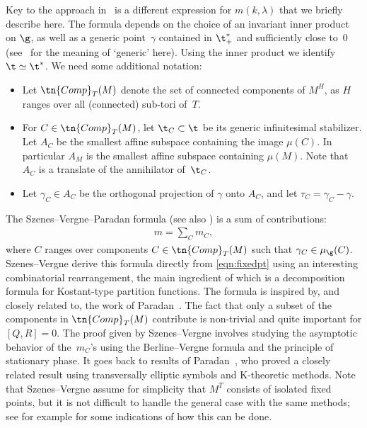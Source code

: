 Key to the approach in~\cite{SzenesVergne2010} is a different expression for $m(k,\lambda)$ that we briefly describe here. The formula depends on the choice of an invariant inner product on $\g$, as well as a generic point~$\gamma$ contained in $\t^\ast_+$ and sufficiently close to~$0$ (see~\cite[Section~4.1]{SzenesVergne2010} for the meaning of `generic' here). Using the inner product we identify $\t \simeq \t^\ast$. We need some additional notation:
\begin{itemize}\itemsep=0pt
\item Let $\tn{Comp}_T(M)$ denote the set of connected components of $M^H$, as $H$ ranges over all (connected) sub-tori of~$T$.
\item For $C \in \tn{Comp}_T(M)$, let $\t_C \subset \t$ be its generic infinitesimal stabilizer. Let $A_C$ be the smallest affine subspace containing the image $\mu(C)$. In particular $A_M$ is the smallest affine subspace containing $\mu(M)$. Note that $A_C$ is a translate of the annihilator of~$\t_C$.
\item Let $\gamma_C \in A_C$ be the orthogonal projection of $\gamma$ onto $A_C$, and let $\tau_C=\gamma_C-\gamma$.
\end{itemize}

The Szenes--Vergne--Paradan formula \cite[equation~(39)]{SzenesVergne2010} (see also \cite[Proposition~41, Theorem~48]{SzenesVergne2010}) is a sum of contributions:
\begin{gather}\label{eqn:SzVer}
m=\sum_C m_C,
\end{gather}
where $C$ ranges over components $C \in \tn{Comp}_T(M)$ such that $\gamma_C \in \mu_\g(C)$. Szenes--Vergne derive this formula directly from \eqref{eqn:fixedpt} using an interesting combinatorial rearrangement, the main ingredient of which is a decomposition formula for Kostant-type partition functions. The formula is inspired by, and closely related to, the work of Paradan~\cite{ParadanRiemannRoch}. The fact that only a subset of the components in $\tn{Comp}_T(M)$ contribute is non-trivial and quite important for $[Q,R]=0$. The proof given by Szenes--Vergne involves studying the asymptotic behavior of the~$m_C$'s using the Berline--Vergne formula and the principle of stationary phase. It goes back to results of Paradan~\cite{ParadanRiemannRoch}, who proved a closely related result using transversally elliptic symbols and K-theoretic methods. Note that Szenes--Vergne assume for simplicity that $M^T$ consists of isolated fixed points, but it is not difficult to handle the general case with the same methods; see for example \cite[Section~7]{VerlindeSums} for some indications of how this can be done.

